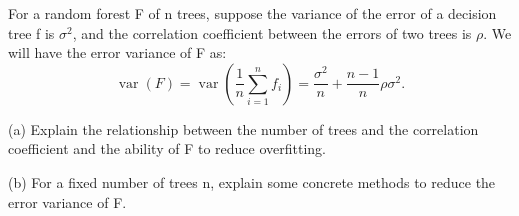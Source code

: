 For a random forest F of n trees, suppose the variance of the error of a decision tree f is \(\sigma^2\), and the correlation coefficient between the errors of two trees is \ensuremath{\rho}. We will have the error variance of F as:
\[
\operatorname{var}(F)=\operatorname{var}\left(\frac1n\sum_{i=1}^nf_i\right)
=\frac{\sigma^2}{n}+\frac{n-1}{n}\rho\sigma^2.
\]


(a) Explain the relationship between the number of trees and the correlation coefficient and the ability of F to reduce overfitting.


(b) For a fixed number of trees n, explain some concrete methods to reduce the error variance of F.
